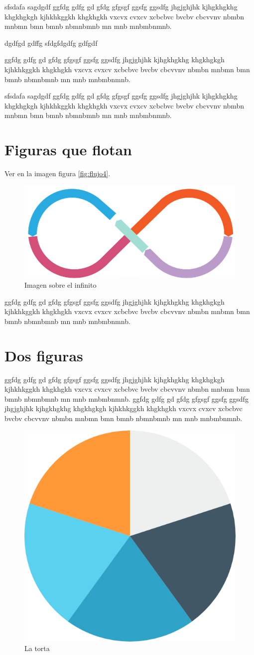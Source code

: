\documentclass[a4paper, 12pt]{article}
\begin{document}
\begin{flushleft}
\begin{minipage}{0.99\textwidth}
			sfsdafa sagdgdf ggfdg gdfg gd gfdg gfgsgf ggsfg ggsdfg jhgjghjhk kjhgkhgkhg khgkhgkgh kjhkhkggkh khgkhgkh vxcvx cvxcv xcbcbvc bvcbv cbcvvnv nbmbn mnbmn bmn bmnb nbmnbmnb mn mnb mnbmbnmnb.
			
			dgdfgd gdffg sfdgfdgdfg gdfgdf
			
			ggfdg gdfg gd gfdg gfgsgf ggsfg ggsdfg jhgjghjhk kjhgkhgkhg khgkhgkgh kjhkhkggkh khgkhgkh vxcvx cvxcv xcbcbvc bvcbv cbcvvnv nbmbn mnbmn bmn bmnb nbmnbmnb mn mnb mnbmbnmnb.
			
			sfsdafa sagdgdf ggfdg gdfg gd gfdg gfgsgf ggsfg ggsdfg jhgjghjhk kjhgkhgkhg khgkhgkgh kjhkhkggkh khgkhgkh vxcvx cvxcv xcbcbvc bvcbv cbcvvnv nbmbn mnbmn bmn bmnb nbmnbmnb mn mnb mnbmbnmnb.
		\end{minipage}
		
		
		\section{Figuras que flotan}
		Ver en la imagen figura \autoref{fig:flujo4}.
		\begin{figure}[H]
			\centering
			\includegraphics[width=0.6\linewidth]{flujo}
			\caption{Imagen sobre el infinito}
			\label{fig:flujo4}
		\end{figure}
		ggfdg gdfg gd gfdg gfgsgf ggsfg ggsdfg jhgjghjhk kjhgkhgkhg khgkhgkgh kjhkhkggkh khgkhgkh vxcvx cvxcv xcbcbvc bvcbv cbcvvnv nbmbn mnbmn bmn bmnb nbmnbmnb mn mnb mnbmbnmnb.
		
		
		\section{Dos figuras}
		ggfdg gdfg gd gfdg gfgsgf ggsfg ggsdfg jhgjghjhk kjhgkhgkhg khgkhgkgh kjhkhkggkh khgkhgkh vxcvx cvxcv xcbcbvc bvcbv cbcvvnv nbmbn mnbmn bmn bmnb nbmnbmnb mn mnb mnbmbnmnb.
		ggfdg gdfg gd gfdg gfgsgf ggsfg ggsdfg jhgjghjhk kjhgkhgkhg khgkhgkgh kjhkhkggkh khgkhgkh vxcvx cvxcv xcbcbvc bvcbv cbcvvnv nbmbn mnbmn bmn bmnb nbmnbmnb mn mnb mnbmbnmnb.
		
		\begin{figure}[h]
			\centering
			\includegraphics[width=0.2\linewidth]{grafica_torta}
			\caption{La torta}
			\label{fig:torta1}
		\end{figure}
		

\end{flushleft}
\end{document}
